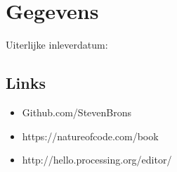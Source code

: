 \documentclass{article}
\begin{document}
\title{\tttt}
\author{Steven Bronsveld}

\maketitle
\section{Gegevens}
Uiterlijke inleverdatum: \textbf{\dddd}
\subsection{Links}
\begin{itemize}
    \item Github.com/StevenBrons 
    \item https://natureofcode.com/book
    \item http://hello.processing.org/editor/
\end{itemize}


\newpage
\end{document}
